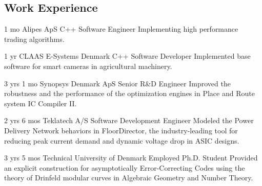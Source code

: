\documentclass[11pt]{article} %
\begin{document}
\begin{paracol}{2}
\switchcolumn

\section{Work Experience}




{1 mo} %
{Alipes ApS} %
{C++ Software Engineer} %
{Implementing high performance trading algorithms.
} %

{1 yr} %
{CLAAS E-Systems Denmark} %
{C++ Software Developer} %
{Implemented base software for smart cameras in agricultural machinery.
} %


{3 yrs 1 mo} %
{Synopsys Denmark ApS} %
{Senior R\&D Engineer} %
{Improved the robustness and the performance of the optimization engines in Place and Route system IC Compiler II.
} %


{2 yrs 6 mos} %
{Teklatech A/S} %
{Software Development Engineer} %
{Modeled the Power Delivery Network behaviors in FloorDirector, the industry-leading tool for reducing peak current demand and dynamic voltage drop in ASIC designs.}  %


{3 yrs 5 mos} %
{Technical University of Denmark} %
{Employed Ph.D. Student} %
{Provided an explicit construction for asymptotically Error-Correcting Codes using the theory of Drinfeld modular curves in Algebraic Geometry and Number Theory.} %


\end{paracol}
\end{document}
